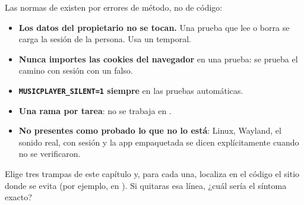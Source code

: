 Las normas de  existen por errores de método, no de código:

\begin{itemize}
  \item \textbf{Los datos del propietario no se tocan.} Una prueba que lee o borra
   se carga la sesión de la persona. Usa un  temporal.
  \item \textbf{Nunca importes las cookies del navegador} en una prueba: se prueba el camino
  con sesión con un  falso.
  \item \textbf{\texttt{MUSICPLAYER\_SILENT=1} siempre} en las pruebas automáticas.
  \item \textbf{Una rama por tarea}: no se trabaja en .
  \item \textbf{No presentes como probado lo que no lo está}: Linux, Wayland, el sonido real,
  con sesión y la app empaquetada se dicen explícitamente cuando no se verificaron.
\end{itemize}

\begin{ejercicio}
Elige tres trampas de este capítulo y, para cada una, localiza en el código el sitio donde se
evita (por ejemplo,  en ). Si quitaras esa
línea, ¿cuál sería el síntoma exacto?
\end{ejercicio}
